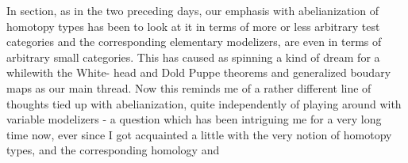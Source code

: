 \margin{$\downarrow$}   In  section,  as in the two preceding days,  our emphasis
 with abelianization of homotopy types has been to look at it
in terms of more or less arbitrary test categories and the corresponding
elementary modelizers,  are even in terms of arbitrary small categories.
This has caused as spinning a kind of dream for a while\hand{,}with the White-%
head and Dold Puppe theorems  and generalized boudary maps as our main
thread.   Now this reminds me of a rather different line of thoughts
tied up with abelianization,  quite independently of playing around
with variable modelizers  -  a question which has been intriguing me
for a very long time now,  ever since  I  got acquainted a little with
the very notion of homotopy types,  and the corresponding homology and

